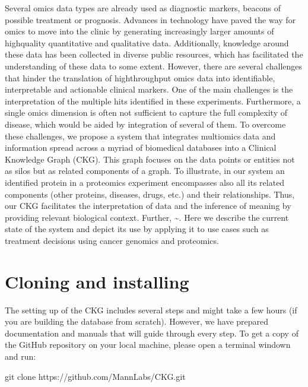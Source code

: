 \documentclass[letterpaper,10pt,english]{sphinxmanual}
\begin{document}

Several omics data types are already used as diagnostic markers, beacons of possible treatment or prognosis. Advances in technology have paved the way for omics to move into the clinic by generating increasingly larger amounts of high\sphinxhyphen{}quality quantitative and qualitative data.  Additionally, knowledge around these data has been collected in diverse public resources, which has facilitated the understanding of these data to some extent. However, there are several challenges that hinder the translation of high\sphinxhyphen{}throughput omics data into identifiable, interpretable and actionable clinical markers. One of the main challenges is the interpretation of the multiple hits identified in these experiments. Furthermore, a single omics dimension is often not sufficient to capture the full complexity of disease, which would be aided by integration of several of them. To overcome these challenges, we propose a system that integrates multi\sphinxhyphen{}omics data and information spread across a myriad of biomedical databases into a Clinical Knowledge Graph (CKG).  This graph focuses on the data points or entities not as silos but as related components of a graph. To illustrate, in our system an identified protein in a proteomics experiment encompasses also all its related components (other proteins, diseases, drugs, etc.) and their relationships. Thus, our CKG facilitates the interpretation of data and the inference of meaning by providing relevant biological context. Further, \textasciitilde{}. Here we describe the current state of the system and depict its use by applying it to use cases such as treatment decisions using cancer genomics and proteomics.


\section{Cloning and installing}
\label{\detokenize{INTRO:cloning-and-installing}}
The setting up of the CKG includes several steps and might take a few hours (if you are building the database from scratch). However, we have prepared documentation and manuals that will guide through every step.
To get a copy of the GitHub repository on your local machine, please open a terminal windown and run:

\begin{sphinxVerbatim}[commandchars=\\\{\}]
\PYGZdl{} git clone https://github.com/MannLabs/CKG.git
\end{sphinxVerbatim}
\end{document}
